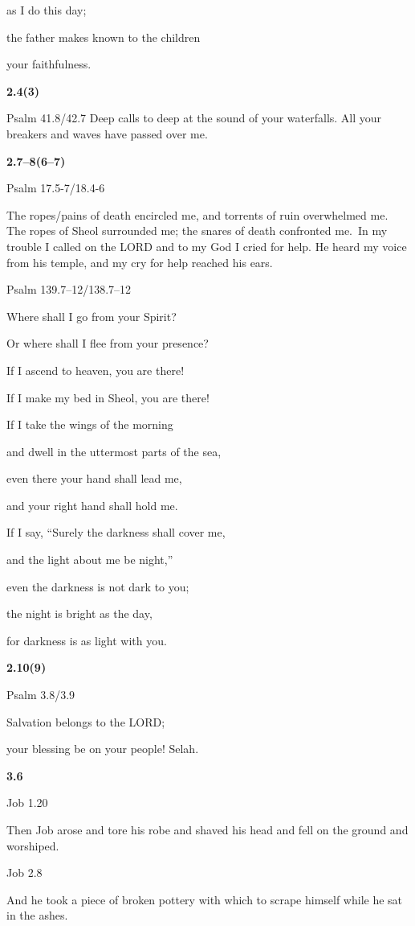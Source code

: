 \documentclass[
]{article}
\newcommand{\RL}[1]{\beginR #1\endR}
\begin{document}
as I do this day;

the father makes known to the children

your faithfulness.

\textbf{2.4(3)}

Psalm 41.8/42.7 Deep calls to deep at the sound of your waterfalls. All
your breakers and waves have passed over me.

\textbf{2.7--8(6--7)}

Psalm 17.5-7/18.4-6

The ropes/pains of death encircled me, and torrents of ruin overwhelmed
me. The ropes of Sheol surrounded me; the snares of death confronted
me.~In my trouble I called on the LORD and to my God I cried for help.
He heard my voice from his temple, and my cry for help reached his ears.

Psalm 139.7--12/138.7--12

Where shall I go from your Spirit?

Or where shall I flee from your presence?

If I ascend to heaven, you are there!

If I make my bed in Sheol, you are there!

If I take the wings of the morning

and dwell in the uttermost parts of the sea,

even there your hand shall lead me,

and your right hand shall hold me.

If I say, \RL{``}Surely the darkness shall cover me,

and the light about me be night,''

even the darkness is not dark to you;

the night is bright as the day,

for darkness is as light with you.

\textbf{2.10(9)}

Psalm 3.8/3.9

Salvation belongs to the LORD;

your blessing be on your people! Selah.

\textbf{3.6}

Job 1.20

Then Job arose and tore his robe and shaved his head and fell on the
ground and worshiped.

Job 2.8

And he took a piece of broken pottery with which to scrape himself while
he sat in the ashes.
\end{document}
